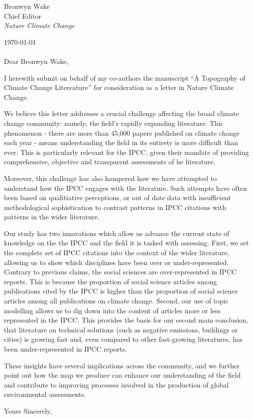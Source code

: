 \documentclass{letter}
\begin{document}
\begin{letter}{Bronwyn Wake \\ Chief Editor \\ \textit{Nature Climate Change}}
		\date{}
		


   \opening{\today \\ \\ Dear Bronwyn Wake,}

   I herewith submit on behalf of my co-authors the manuscript ``A Topography of Climate Change Litereature'' for consideration as a letter in Nature Climate Change.

We believe this letter addresses a crucial challenge affecting the broad climate change community: namely, the field's rapidly expanding literature. This phenomenon - there are more than 45,000 papers published on climate change each year - means understanding the field in its entirety is more difficult than ever. 
This is particularly relevant for the IPCC, given their mandate of providing comprehensive, objective and transparent assessments of he literature. 

Moreover, this challenge has also hampered how we have attempted to understand how the IPCC engages with the literature. Such attempts \cite{Bjurström2011, Hulme2010, Victor2015, Corbera2016, Kowarsch2017} have often been based on qualitiative perceptions, or out of date data with insufficient methodological sophistication to contrast patterns in IPCC citations with patterns in the wider literature.

Our study has two innovations which allow us advance the current state of knowledge on the the IPCC and the field it is tasked with assessing. First, we set the complete set of IPCC citations into the context of the wider literature, allowing us to show which disciplines have been over or under-represented.  Contrary to previous claims, the social sciences are over-represented in IPCC reports. This is because the proportion of social science articles among publications cited by the IPCC is higher than the proportion of social science articles among all publications on climate change. 
Second, our use of topic modelling allows us to dig down into the content of articles more or less represented in the IPCC. This provides the basis for our second main conclusion, that literature on technical solutions (such as negative emissions, buildings or cities) is growing fast and, even compared to other fast-growing literatures, has been under-represented in IPCC reports.

These insights have several implications across the community, and we further point out how the map we produce can enhance our understanding of the field and contribute to improving processes involved in the production of global environmental assessments.

\closing{Yours Sincerely,}





\end{letter}
\end{document}
